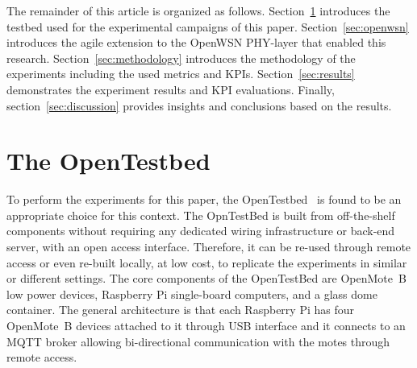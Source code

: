 \documentclass[sensors,article,submit,moreauthors,pdftex]{Definitions/mdpi}
\begin{document}
The remainder of this article is organized as follows.
    Section~\ref{sec:opentested} introduces the testbed used for the experimental campaigns of this paper.
    Section~\ref{sec:openwsn} introduces the agile extension to the OpenWSN PHY-layer that enabled this research.
    Section~\ref{sec:methodology} introduces the methodology of the experiments including the used metrics and KPIs.
    Section~\ref{sec:results} demonstrates the experiment results and KPI evaluations.
    Finally, section~\ref{sec:discussion} provides insights and conclusions based on the results. 

\section{The OpenTestbed}
\label{sec:opentested}


To perform the experiments for this paper, the OpenTestbed~\cite{munoz19opentestbed} is found to be an appropriate choice for this context.
The OpnTestBed is built from off-the-shelf components without requiring any dedicated wiring infrastructure or back-end server, with an open access interface. 
Therefore, it can be re-used through remote access or even re-built locally, at low cost, to replicate the experiments in similar or different settings.  
The core components of the OpenTestBed are OpenMote~B low power devices, Raspberry Pi single-board computers, and a glass dome container.
The general architecture is that each Raspberry Pi has four OpenMote~B devices attached to it through USB interface and it connects to an MQTT broker allowing bi-directional communication with the motes through remote access. 

\end{document}
